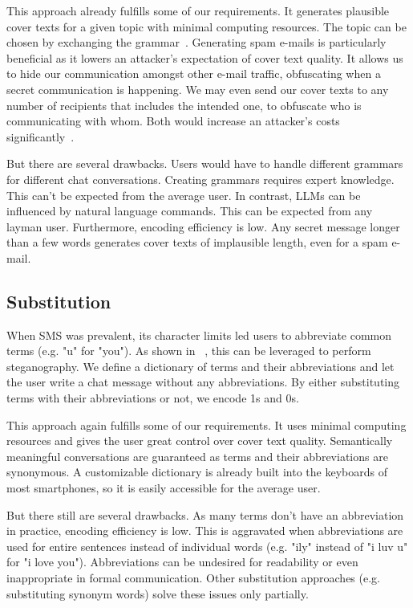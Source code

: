 This approach already fulfills some of our requirements. It generates plausible cover texts for a given topic with minimal computing resources. The topic can be chosen by exchanging the grammar~\cite{spammimicSpammimic2000}. Generating spam e-mails is particularly beneficial as it lowers an attacker's expectation of cover text quality. It allows us to hide our communication amongst other e-mail traffic, obfuscating when a secret communication is happening. We may even send our cover texts to any number of recipients that includes the intended one, to obfuscate who is communicating with whom. Both would increase an attacker's costs significantly~\cite{bennettLinguisticSteganographySurvey2004,petitcolasInformationHidingSurvey1999}.

But there are several drawbacks. Users would have to handle different grammars for different chat conversations. Creating grammars requires expert knowledge. This can't be expected from the average user. In contrast, \glspl{LLM} can be influenced by natural language commands. This can be expected from any layman user. Furthermore, encoding efficiency is low. Any secret message longer than a few words generates cover texts of implausible length, even for a spam e-mail.

\subsection{Substitution}
\label{sec:substitution}
When \gls{SMS} was prevalent, its character limits led users to abbreviate common terms (e.g. "u" for "you"). As shown in ~\cite{shirali-shahrezaTextSteganographySMS2007}, this can be leveraged to perform steganography. We define a dictionary of terms and their abbreviations and let the user write a chat message without any abbreviations. By either substituting terms with their abbreviations or not, we encode 1s and 0s.

This approach again fulfills some of our requirements. It uses minimal computing resources and gives the user great control over cover text quality. Semantically meaningful conversations are guaranteed as terms and their abbreviations are synonymous. A customizable dictionary is already built into the keyboards of most smartphones, so it is easily accessible for the average user.

But there still are several drawbacks. As many terms don't have an abbreviation in practice, encoding efficiency is low. This is aggravated when abbreviations are used for entire sentences instead of individual words (e.g. "ily" instead of "i luv u" for "i love you"). Abbreviations can be undesired for readability or even inappropriate in formal communication. Other substitution approaches (e.g. substituting synonym words) solve these issues only partially.


